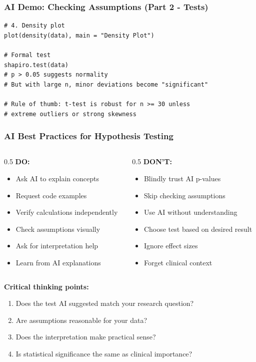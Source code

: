 \documentclass{beamer}
\begin{document}
\begin{frame}[fragile]
\frametitle{AI Demo: Checking Assumptions (Part 2 - Tests)}
\tiny
\begin{verbatim}
# 4. Density plot
plot(density(data), main = "Density Plot")

# Formal test
shapiro.test(data)
# p > 0.05 suggests normality
# But with large n, minor deviations become "significant"

# Rule of thumb: t-test is robust for n >= 30 unless
# extreme outliers or strong skewness
\end{verbatim}
\end{frame}

\begin{frame}
\frametitle{AI Best Practices for Hypothesis Testing}
\begin{columns}
\begin{column}{0.5\textwidth}
\textbf{DO:}
\begin{itemize}
\item Ask AI to explain concepts
\item Request code examples
\item Verify calculations independently
\item Check assumptions visually
\item Ask for interpretation help
\item Learn from AI explanations
\end{itemize}
\end{column}

\begin{column}{0.5\textwidth}
\textbf{DON'T:}
\begin{itemize}
\item Blindly trust AI p-values
\item Skip checking assumptions
\item Use AI without understanding
\item Choose test based on desired result
\item Ignore effect sizes
\item Forget clinical context
\end{itemize}
\end{column}
\end{columns}

\vspace{0.3cm}
\textbf{Critical thinking points:}
\begin{enumerate}
\item Does the test AI suggested match your research question?
\item Are assumptions reasonable for your data?
\item Does the interpretation make practical sense?
\item Is statistical significance the same as clinical importance?
\end{enumerate}
\end{frame}
\end{document}
